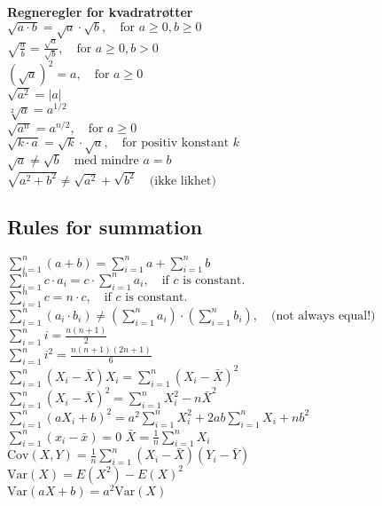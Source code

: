 \documentclass[a4paper,7pt,fleqn]{article}
\begin{document}
\begin{multicols}{3}
\begin{minipage}{\linewidth}
    \textbf{Regneregler for kvadratrøtter} \\
    \(\sqrt{a \cdot b} = \sqrt{a} \cdot \sqrt{b}, \quad \text{for } a \geq 0, b \geq 0\) \\
    \(\sqrt{\frac{a}{b}} = \frac{\sqrt{a}}{\sqrt{b}}, \quad \text{for } a \geq 0, b > 0\) \\
    \((\sqrt{a})^2 = a, \quad \text{for } a \geq 0\) \\
    \(\sqrt{a^2} = |a|\) \\
    \(\sqrt[2]{a} = a^{1/2}\) \\
    \(\sqrt{a^n} = a^{n/2}, \quad \text{for } a \geq 0\) \\
    \(\sqrt{k \cdot a} = \sqrt{k} \cdot \sqrt{a}, \quad \text{for positiv konstant } k\) \\
    \(\sqrt{a} \neq \sqrt{b} \quad \text{med mindre } a = b\) \\
    \(\sqrt{a^2 + b^2} \neq \sqrt{a^2} + \sqrt{b^2} \quad \text{(ikke likhet)}\)
\end{minipage}

\begin{minipage}{\linewidth}
\subsection{Rules for summation} 

\(\sum_{i=1}^n (a + b) = \sum_{i=1}^n a + \sum_{i=1}^n b\) \\
\(\sum_{i=1}^n c \cdot a_i = c \cdot \sum_{i=1}^n a_i, \quad \text{if } c \text{ is constant.}\) \\
\(\sum_{i=1}^n c = n \cdot c, \quad \text{if } c \text{ is constant.}\) \\
\(\sum_{i=1}^n (a_i \cdot b_i) \neq \left( \sum_{i=1}^n a_i \right) \cdot \left( \sum_{i=1}^n b_i \right), \quad \text{(not always equal!)}\) \\
\(\sum_{i=1}^n i = \frac{n(n+1)}{2}\) \\
\(\sum_{i=1}^n i^2 = \frac{n(n+1)(2n+1)}{6}\) \\
\(\sum_{i=1}^n (X_i - \bar{X}) X_i = \sum_{i=1}^n (X_i - \bar{X})^2\) \\
\(\sum_{i=1}^n (X_i - \bar{X})^2 = \sum_{i=1}^n X_i^2 - n\bar{X}^2\) \\
\(\sum_{i=1}^n (a X_i + b)^2 = a^2 \sum_{i=1}^n X_i^2 + 2ab \sum_{i=1}^n X_i + nb^2\) \\
\(\sum_{i=1}^n (x_i - \bar{x}) = 0\)
\(\bar{X} = \frac{1}{n} \sum_{i=1}^n X_i\)
\(\text{Cov}(X, Y) = \frac{1}{n} \sum_{i=1}^n (X_i - \bar{X})(Y_i - \bar{Y})\) \\
\(\text{Var}(X) = E(X^2) - E(X)^2\) \\
\(\text{Var}(aX + b) = a^2 \text{Var}(X)\) \\
\end{minipage}


\end{multicols}
\end{document}
